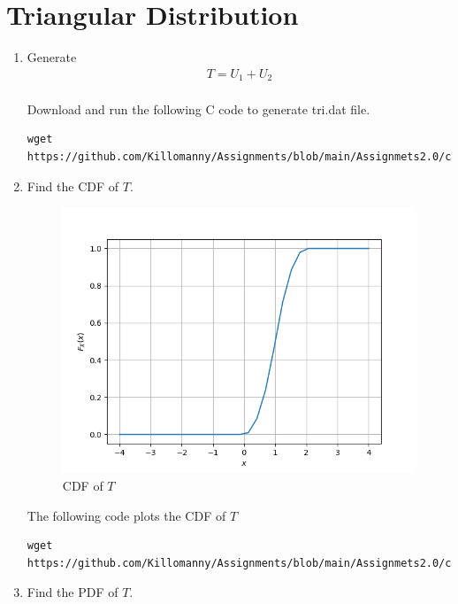 \documentclass[journal,12pt,twocolumn]{IEEEtran}
\renewcommand\thesection{\arabic{section}}
\begin{document}
\section{Triangular Distribution}
\begin{enumerate}[label=\thesection.\arabic*
,ref=\thesection.\theenumi]
    \item Generate
    \begin{align}
        T = U_1 + U_2
    \end{align}
\solution\\
Download and run the following C code to generate tri.dat file.
\begin{lstlisting}
wget https://github.com/Killomanny/Assignments/blob/main/Assignmets2.0/codes/4.1.c
\end{lstlisting}
\item Find the CDF of $T$.\\
\solution
\begin{figure}[h!]
    \centering
    \includegraphics[width=\columnwidth]{figs/4.2.png}
    \caption{CDF of $T$}
    \label{fig:my_label}
\end{figure}
\clearpage
The following code plots the CDF of $T$
\begin{lstlisting}
wget https://github.com/Killomanny/Assignments/blob/main/Assignmets2.0/codes/4.2.py
\end{lstlisting}
\item Find the PDF of $T$.
\solution
\begin{figure}[h!]
    \centering

\end{figure}
\end{enumerate}
\end{document}
